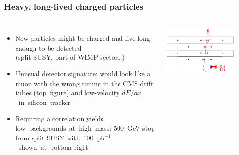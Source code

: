 \documentclass[compress]{beamer}
\begin{document}
\begin{frame}
\frametitle{Heavy, long-lived charged particles}

\begin{columns}
\begin{itemize}
\item New particles might be charged and live long enough to be detected \\ (split SUSY, part of WIMP sector\ldots)

\item Unusual detector signature: would look like a muon with the
  wrong timing in the CMS drift tubes \mbox{(top figure)\hspace{-0.5 cm}} and low-velocity \mbox{$dE/dx$ in silicon tracker\hspace{-3 cm}}

\item Requiring a correlation yields \mbox{low backgrounds at high mass:\hspace{-4 cm}} 500~GeV stop from split SUSY \mbox{with 100~pb$^{-1}$ shown at bottom-right\hspace{-5 cm}}

\end{itemize}

\hfill \includegraphics[width=\linewidth]{champ_track_signature.png}

\vspace{0.5 cm}
\mbox{ }
\end{columns}


\end{frame}
\end{document}
